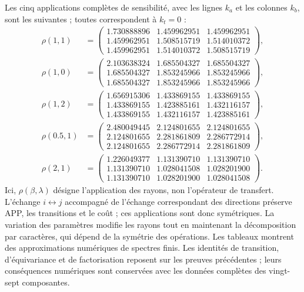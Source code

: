 Les cinq applications complètes de sensibilité, avec les lignes $k_a$ et les colonnes
$k_b$, sont les suivantes ; toutes correspondent à $k_t=0$ :
\begin{align*}
\rho(1,1)&=\begin{pmatrix}
1.730888896&1.459962951&1.459962951\\
1.459962951&1.508515719&1.514010372\\
1.459962951&1.514010372&1.508515719
\end{pmatrix},\\
\rho(1,0)&=\begin{pmatrix}
2.103638324&1.685504327&1.685504327\\
1.685504327&1.853245966&1.853245966\\
1.685504327&1.853245966&1.853245966
\end{pmatrix},\\
\rho(1,2)&=\begin{pmatrix}
1.656915306&1.433869155&1.433869155\\
1.433869155&1.423885161&1.432116157\\
1.433869155&1.432116157&1.423885161
\end{pmatrix},\\
\rho(0.5,1)&=\begin{pmatrix}
2.480049445&2.124801655&2.124801655\\
2.124801655&2.281861809&2.286772914\\
2.124801655&2.286772914&2.281861809
\end{pmatrix},\\
\rho(2,1)&=\begin{pmatrix}
1.226049377&1.131390710&1.131390710\\
1.131390710&1.028041508&1.028201900\\
1.131390710&1.028201900&1.028041508
\end{pmatrix}.
\end{align*}
Ici, $\rho(\beta,\lambda)$ désigne l’application des rayons, non l’opérateur de
transfert. L’échange $i\leftrightarrow j$ accompagné de l’échange
correspondant des directions préserve APP, les transitions et le coût ;
ces applications sont donc symétriques. La variation des paramètres modifie les rayons tout en maintenant
la décomposition par caractères, qui dépend de la symétrie des
opérations. Les tableaux montrent des approximations numériques de spectres
finis. Les identités de transition, d’équivariance et de factorisation
reposent sur les preuves précédentes ; leurs conséquences numériques sont
conservées avec les données complètes des vingt-sept composantes.

